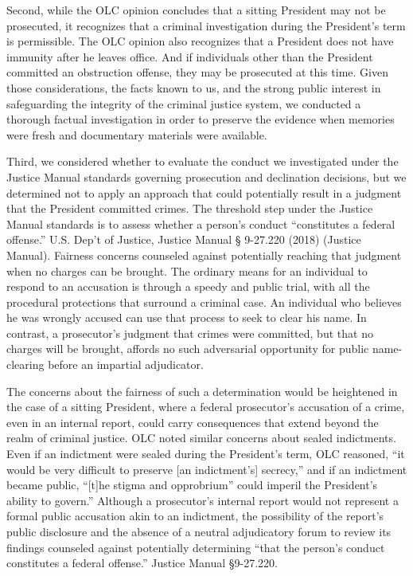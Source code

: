 Second, while the OLC opinion concludes that a sitting President may not be prosecuted, it recognizes that a criminal investigation during the President’s term is permissible.%
The OLC opinion also recognizes that a President does not have immunity after he leaves office.%
And if individuals other than the President committed an obstruction offense, they may be prosecuted at this time. 
Given those considerations, the facts known to us, and the strong public interest in safeguarding the integrity of the criminal justice system, we conducted a thorough factual investigation in order to preserve the evidence when memories were fresh and documentary materials were available.

Third, we considered whether to evaluate the conduct we investigated under the Justice Manual standards governing prosecution and declination decisions, but we determined not to apply an approach that could potentially result in a judgment that the President committed crimes. 
The threshold step under the Justice Manual standards is to assess whether a person’s conduct
“constitutes a federal offense.” 
U.S. Dep’t of Justice, Justice Manual § 9-27.220 (2018) (Justice Manual). 
Fairness concerns counseled against potentially reaching that judgment when no charges can be brought. 
The ordinary means for an individual to respond to an accusation is through a speedy and public trial, with all the procedural protections that surround a criminal case. 
An individual who believes he was wrongly accused can use that process to seek to clear his name. 
In contrast, a prosecutor’s judgment that crimes were committed, but that no charges will be brought, affords no such adversarial opportunity for public name-clearing before an impartial adjudicator.%

The concerns about the fairness of such a determination would be heightened in the case of a sitting President, where a federal prosecutor’s accusation of a crime, even in an internal report, could carry consequences that extend beyond the realm of criminal justice. 
OLC noted similar concerns about sealed indictments. 
Even if an indictment were sealed during the President’s term, OLC reasoned, “it would be very difficult to preserve [an indictment’s] secrecy,” and if an indictment became public, “[t]he stigma and opprobrium” could imperil the President’s ability to govern.”%
Although a prosecutor’s internal report would not represent a formal public accusation akin to an indictment, the possibility of the report’s public disclosure and the absence of a neutral adjudicatory forum to review its findings counseled against potentially determining “that the person’s conduct constitutes a federal offense.” 
Justice Manual \S 9-27.220.

